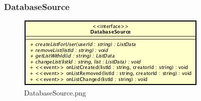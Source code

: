 \subsubsection{DatabaseSource}

\label{DatabaseSource}
\begin{figure}[ht]
	\centering
	\includegraphics[scale=0.5]{Sezioni/SottosezioniST/img/app/DatabaseSource.png}
	\caption{DatabaseSource.png}
\end{figure}

